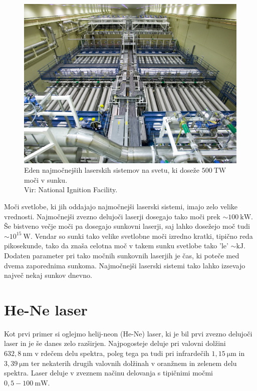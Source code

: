 \begin{figure}[h!]
\centering
\includegraphics[width=100truemm]{slike/07_NIF_Laser_Bay.jpg}
\caption{Eden najmočnejših laserskih sistemov na svetu, ki doseže 
$500~\si{\tera\watt}$ moči v sunku. \\Vir: National Ignition Facility.}
\label{fig:NIF}
\end{figure}

Moči svetlobe, ki jih oddajajo najmočnejši laserski sistemi, imajo zelo velike
vrednosti. Najmočnejši zvezno delujoči laserji dosegajo tako moči prek 
$\sim 100~\si{\kilo\watt}$. Še bistveno večje moči pa dosegajo sunkovni laserji, 
saj lahko dosežejo moč tudi $\sim 10^{15}~\si{\watt}$. 
Vendar so sunki tako velike svetlobne moči izredno kratki, tipično reda pikosekunde, tako da
znaša celotna moč v takem sunku svetlobe tako 'le' $\sim \si{\kilo\joule}$. Dodaten 
parameter pri tako močnih sunkovnih laserjih je čas, ki poteče med dvema zaporednima
sunkoma. Najmočnejši laserski sistemi tako lahko izsevajo največ nekaj sunkov dnevno. 

\section{He-Ne laser}

Kot prvi primer si oglejmo helij-neon (He-Ne) laser, ki je bil prvi zvezno 
delujoči laser in je še danes zelo razširjen. Najpogosteje deluje 
pri valovni dolžini $632,8~\si{\nano\metre}$ v rdečem delu spektra, poleg 
tega pa tudi pri infrardečih $1,15~\si{\micro\metre}$ in 
$3,39~\si{\micro\metre}$ ter nekaterih drugih
valovnih dolžinah v oranžnem in zelenem delu spektra. Laser deluje v zveznem 
načinu delovanja s tipičnimi močmi $0,5 - 100~\si{\milli\watt}$.

